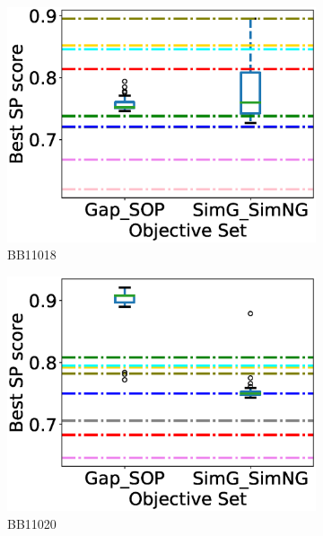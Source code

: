 \begin{figure}[!htbp]
\begin{adjustwidth}{-1cm}{-1cm}
\begin{subfigure}{0.26\textwidth}
			\includegraphics[width=\columnwidth]{Figure/summary/precomputedInit/Balibase/BB11018_objset_pairs_rank_2}
			\caption{BB11018}
\end{subfigure}
		\begin{subfigure}{0.26\textwidth}
			\includegraphics[width=\columnwidth]{Figure/summary/precomputedInit/Balibase/BB11020_objset_pairs_rank_2}
			\caption{BB11020}
\end{subfigure}
\begin{subfigure}{0.26\textwidth}

\end{subfigure}
\end{adjustwidth}
\end{figure}
